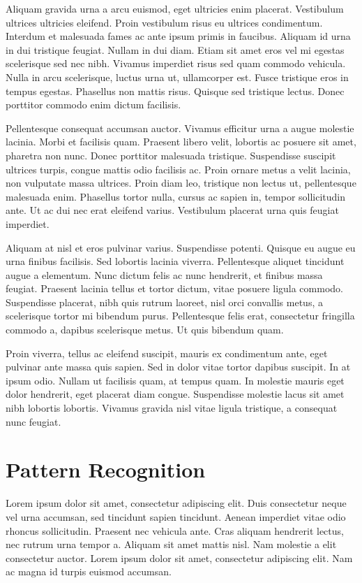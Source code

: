 Aliquam gravida urna a arcu euismod, eget ultricies enim placerat. Vestibulum ultrices ultricies eleifend. Proin vestibulum risus eu ultrices condimentum. Interdum et malesuada fames ac ante ipsum primis in faucibus. Aliquam id urna in dui tristique feugiat. Nullam in dui diam. Etiam sit amet eros vel mi egestas scelerisque sed nec nibh. Vivamus imperdiet risus sed quam commodo vehicula. Nulla in arcu scelerisque, luctus urna ut, ullamcorper est. Fusce tristique eros in tempus egestas. Phasellus non mattis risus. Quisque sed tristique lectus. Donec porttitor commodo enim dictum facilisis.

Pellentesque consequat accumsan auctor. Vivamus efficitur urna a augue molestie lacinia. Morbi et facilisis quam. Praesent libero velit, lobortis ac posuere sit amet, pharetra non nunc. Donec porttitor malesuada tristique. Suspendisse suscipit ultrices turpis, congue mattis odio facilisis ac. Proin ornare metus a velit lacinia, non vulputate massa ultrices. Proin diam leo, tristique non lectus ut, pellentesque malesuada enim. Phasellus tortor nulla, cursus ac sapien in, tempor sollicitudin ante. Ut ac dui nec erat eleifend varius. Vestibulum placerat urna quis feugiat imperdiet.

Aliquam at nisl et eros pulvinar varius. Suspendisse potenti. Quisque eu augue eu urna finibus facilisis. Sed lobortis lacinia viverra. Pellentesque aliquet tincidunt augue a elementum. Nunc dictum felis ac nunc hendrerit, et finibus massa feugiat. Praesent lacinia tellus et tortor dictum, vitae posuere ligula commodo. Suspendisse placerat, nibh quis rutrum laoreet, nisl orci convallis metus, a scelerisque tortor mi bibendum purus. Pellentesque felis erat, consectetur fringilla commodo a, dapibus scelerisque metus. Ut quis bibendum quam.

Proin viverra, tellus ac eleifend suscipit, mauris ex condimentum ante, eget pulvinar ante massa quis sapien. Sed in dolor vitae tortor dapibus suscipit. In at ipsum odio. Nullam ut facilisis quam, at tempus quam. In molestie mauris eget dolor hendrerit, eget placerat diam congue. Suspendisse molestie lacus sit amet nibh lobortis lobortis. Vivamus gravida nisl vitae ligula tristique, a consequat nunc feugiat.

\section{Pattern Recognition}

Lorem ipsum dolor sit amet, consectetur adipiscing elit. Duis consectetur neque vel urna accumsan, sed tincidunt sapien tincidunt. Aenean imperdiet vitae odio rhoncus sollicitudin. Praesent nec vehicula ante. Cras aliquam hendrerit lectus, nec rutrum urna tempor a. Aliquam sit amet mattis nisl. Nam molestie a elit consectetur auctor. Lorem ipsum dolor sit amet, consectetur adipiscing elit. Nam ac magna id turpis euismod accumsan.

